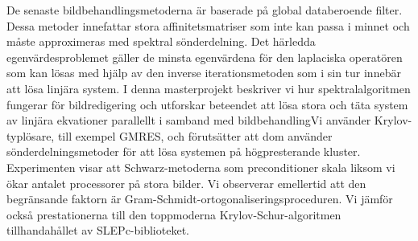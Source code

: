 De senaste bildbehandlingsmetoderna är baserade på global databeroende filter.
Dessa metoder innefattar stora affinitetsmatriser som inte kan passa i minnet och måste approximeras med spektral sönderdelning.
Det härledda egenvärdesproblemet gäller de minsta egenvärdena för den laplaciska operatören som kan lösas med hjälp av den inverse iterationsmetoden som i sin tur innebär att lösa linjära system.
I denna masterprojekt beskriver vi hur spektralalgoritmen fungerar för bildredigering och utforskar beteendet att lösa stora och täta system av linjära ekvationer parallellt i samband med bildbehandlingVi använder Krylov-typlösare, till exempel GMRES, och förutsätter att dom använder sönderdelningsmetoder för att lösa systemen på högpresterande kluster.
Experimenten visar att Schwarz-metoderna som preconditioner skala liksom vi ökar antalet processorer på stora bilder.
Vi observerar emellertid att den begränsande faktorn är Gram-Schmidt-ortogonaliseringsproceduren.
Vi jämför också prestationerna till den toppmoderna Krylov-Schur-algoritmen tillhandahållet av SLEPc-biblioteket.
